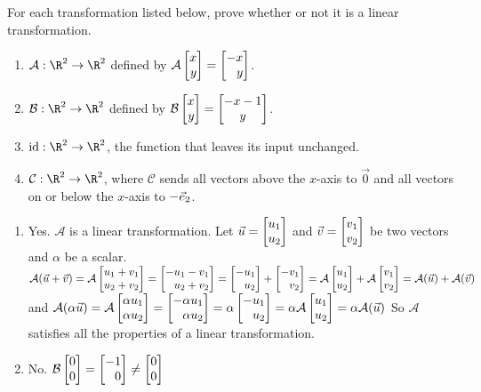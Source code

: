 \begin{exercises}
	\begin{problist}
		\prob For each transformation listed below, prove whether or not it is a linear transformation.
		\label{PROBSETMOD9-linnonlin}
		\begin{enumerate}
			\item $\mathcal A:\R^2\to\R^2$ defined by $\mathcal A\mat{x\\y}=\mat{-x\\y}$.
			\item $\mathcal B:\R^2\to\R^2$ defined by $\mathcal B\mat{x\\y}=\matc{-x-1\\y}$.
			\item $\Ident:\R^2\to\R^2$, the function that leaves its input unchanged.
			\item $\mathcal C:\R^2\to\R^2$, where $\mathcal C$ sends all vectors above the $x$-axis to $\vec 0$
				and all vectors on or below the $x$-axis to $-{\vec e_2}$.
		\end{enumerate}
		\begin{solution}
		  \begin{enumerate}
		    \item Yes. $\mathcal{A}$ is a linear transformation. Let $\vec{u} = \mat{u_1\\u_2}$
and $\vec{v} = \mat{v_1 \\ v_2}$
 be two vectors and $\alpha$ be a scalar.
$\mathcal{A} (\vec{u}+\vec{v}) = \mathcal{A}\mat{u_1 + v_1 \\ u_2 + v_2} = \mat{-u_1 - v_1 \\ u_2 + v_2 } = \mat{-u_1 \\ u_2 } + \mat{ - v_1 \\  v_2 } = \mathcal{A}\mat{u_1\\u_2} + \mathcal{A}\mat{v_1 \\ v_2} = \mathcal{A} (\vec{u}) +\mathcal{A} (\vec{v})$ and
$\mathcal{A}(\alpha \vec{u}) = \mathcal{A}\mat{\alpha u_1 \\ \alpha u_2} = \mat{ - \alpha u_1 \\ \alpha u_2} = \alpha \mat{ - u_1 \\u_2} = \alpha \mathcal{A}\mat{ u_1 \\u_2} = \alpha \mathcal{A}(\vec{u}) $
So $\mathcal{A}$ satisfies all the properties of a linear transformation.
        \item No. $\mathcal{B}\mat{0\\0} = \mat{-1\\0} \neq \mat{0\\0}$

\end{enumerate}
\end{solution}
\end{problist}
\end{exercises}
